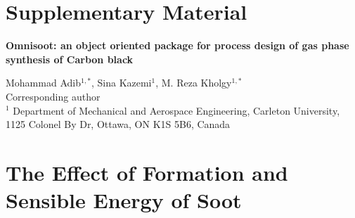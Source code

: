 \section*{Supplementary Material}

\begin{center}
	\vspace*{1cm} %
	\textbf{\LARGE 		Omnisoot: an object oriented package for process design of gas phase synthesis of Carbon black} 
\end{center}

\begin{center}
	Mohammad Adib$^{1,*}$, Sina Kazemi$^1$, M. Reza Kholgy$^{1,*}$ \\
	{\small *Corresponding author} \\
	$^1$ Department of Mechanical and Aerospace Engineering, Carleton University, 1125 Colonel By Dr, Ottawa, ON K1S 5B6, Canada
\end{center}

\beginsupplement


\section{The Effect of Formation and Sensible Energy of Soot}


